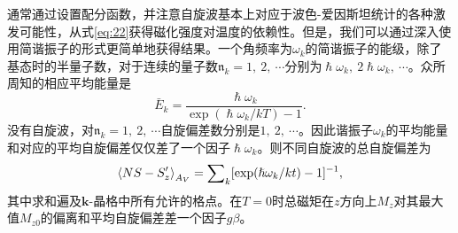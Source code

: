 \documentclass{article}
\begin{document}
通常通过设置配分函数，并注意自旋波基本上对应于波色-爱因斯坦统计的各种激发可能性，从式\eqref{eq:22}获得磁化强度对温度的依赖性。但是，我们可以通过深入使用简谐振子的形式更简单地获得结果。一个角频率为$\omega_k$的简谐振子的能级，除了基态时的半量子数，对于连续的量子数$\mathfrak{n}_k=1,~2,~\cdots$分别为$\hslash\omega_k,~2\hslash\omega_k,~\cdots$。众所周知的相应平均能量是
\begin{equation} \label{eq:24}
\bar{E}_k=\frac{\hslash\omega_k}{\exp(\hslash\omega_k/kT)-1}.
\end{equation}
没有自旋波，对$\mathfrak{n}_k=1,~2,~\cdots$自旋偏差数分别是$1,~2,~\cdots$。因此谐振子$\omega_k$的平均能量和对应的平均自旋偏差仅仅差了一个因子$\hslash\omega_k$。则不同自旋波的总自旋偏差为
\begin{equation} \label{eq:25}
\braket{NS-S_z'}_{A_V}=\sum\nolimits_k[\exp(\hslash\omega_k/kt)-1]^{-1},
\end{equation}
其中求和遍及$\mathbf{k}$-晶格中所有允许的格点。在$T=0$时总磁矩在$z$方向上$M_z$对其最大值$M_{z0}$的偏离和平均自旋偏差差一个因子$g\beta$。
\end{document}
